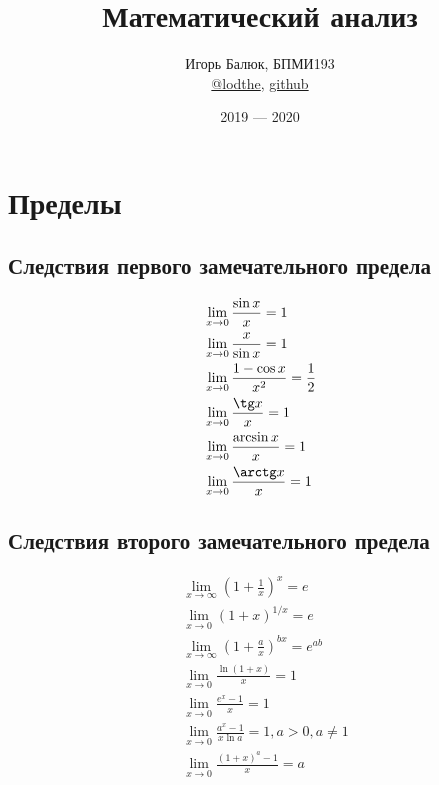 \documentclass[12pt, a4paper]{article}
\title{Математический анализ}
\author{
	Игорь Балюк, БПМИ193 \\ 
	\href{https://teleg.run/lodthe}{@lodthe}, \href{https://github.com/LoDThe/hse-tex}{github}
}
\date{2019 --- 2020}
\begin{document}
	\maketitle
	\tableofcontents
	\newpage
	\section{Пределы}

	\subsection{Следствия первого замечательного предела}
	\begin{align*}
		&\lim_{x \to 0} \dfrac{\sin x}{x} = 1 \\
		&\lim_{x \to 0} \dfrac{x}{\sin x} = 1 \\
		&\lim_{x \to 0} \dfrac{1 - \cos x}{x^2} = \dfrac{1}{2} \\
		&\lim_{x \to 0} \dfrac{\tg x}{x} = 1 \\
		&\lim_{x \to 0} \dfrac{\arcsin x}{x} = 1 \\
		&\lim_{x \to 0} \dfrac{\arctg x}{x} = 1 \\
	\end{align*}	

	\subsection{Следствия второго замечательного предела}
	\begin{align*}
		&\lim_{x \to \infty} \left(1 + \frac{1}{x}\right)^x = e \\
		&\lim_{x \to 0} \left(1 + x\right)^{1/x} = e \\
		&\lim_{x \to \infty} \left(1 + \frac{a}{x}\right)^{bx} = e^{ab} \\
		&\lim_{x \to 0} \frac{\ln (1 + x)}{x} = 1 \\
		&\lim_{x \to 0} \frac{e^x - 1}{x} = 1 \\
		&\lim_{x \to 0} \frac{a^x - 1}{x \ln a} = 1, a > 0, a \neq 1 \\
		&\lim_{x \to 0} \frac{(1 + x)^a - 1}{x} = a
	\end{align*}
\end{document}
